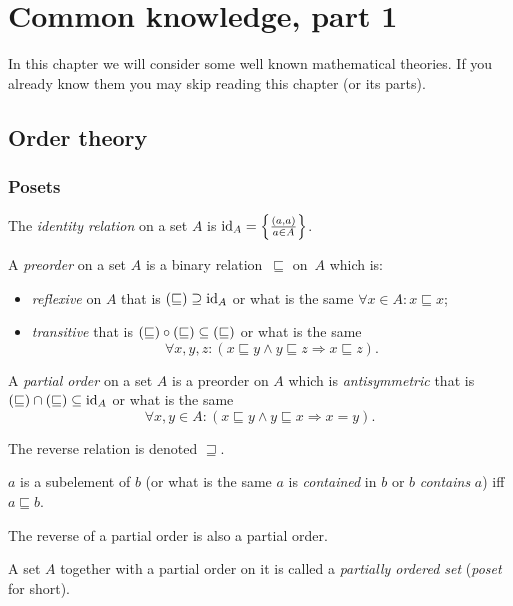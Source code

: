 % 
\chapter{\label{chap-common}Common knowledge, part 1}

In this chapter we will consider some well known mathematical theories.
If you already know them you may skip reading this chapter (or its
parts).


\section{Order theory}


\subsection{Posets}
\begin{defn}
The \emph{identity relation} on a set $A$
is ${\operatorname{id}}_{A}=\left\{ \frac{(a,a)}{a\in A}\right\}$.
\end{defn}

\begin{defn}
A \emph{preorder} on a set $A$ is a binary relation~$\sqsubseteq$ on~$A$ which is:
\begin{itemize}
\item \emph{reflexive} on $A$ that is $\left(\mathord{\sqsubseteq}\right)\supseteq{\operatorname{id}}_{A}$ or what is the same $\forall x\in A:x\sqsubseteq x$;
\item \emph{transitive} that is $\left(\mathord{\sqsubseteq}\right)\circ\left(\mathord{\sqsubseteq}\right)\subseteq\left(\mathord{\sqsubseteq}\right)$
 or what is the same \[ \forall x,y,z:(x\sqsubseteq y\land y\sqsubseteq z\Rightarrow x\sqsubseteq z). \]
\end{itemize}
\end{defn}

\begin{defn}
A \emph{partial order} on a set $A$ is a preorder
on $A$ which is \emph{antisymmetric} that is $\left(\mathord{\sqsubseteq}\right)\cap\left(\mathord{\sqsubseteq}\right)\subseteq{\operatorname{id}}_A$
or what is the same \[ \forall x,y\in A:(x\sqsubseteq y\land y\sqsubseteq x\Rightarrow x=y). \]
\end{defn}
The reverse relation is denoted $\sqsupseteq$.

\begin{defn}
$a$ is a subelement of $b$ (or what is the same
$a$ is \emph{contained} in $b$ or $b$ \emph{contains} $a$) iff
$a\sqsubseteq b$.\end{defn}
\begin{obvious}
The reverse of a partial order is also a partial order.\end{obvious}
\begin{defn}
A set $A$ together with
a partial order on it is called a \emph{partially ordered set} (\emph{poset}
for short).
\end{defn}

